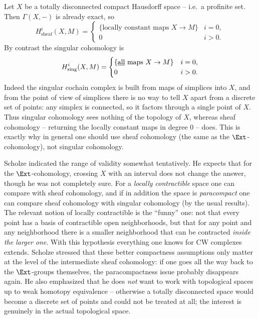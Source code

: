 \begin{example}
\label{ex:4:totally-disconnected}
Let $X$ be a totally disconnected compact Hausdorff space -- i.e.\ a profinite
set. Then $\Gamma(X,-)$ is already exact, so
\begin{equation*}
H^{i}_{\mathrm{sheaf}}(X,M)=
\begin{cases}
\{\text{locally constant maps }X\to M\} & i=0,\\
0 & i>0.
\end{cases}
\end{equation*}
By contrast the singular cohomology is
\begin{equation*}
H^{i}_{\mathrm{sing}}(X,M)=
\begin{cases}
\{\text{\underline{all} maps }X\to M\} & i=0,\\
0 & i>0.
\end{cases}
\end{equation*}
Indeed the singular cochain complex is built from maps of simplices into $X$, and
from the point of view of simplices there is no way to tell $X$ apart from a
discrete set of points: any simplex is connected, so it factors through a single
point of $X$. Thus singular cohomology sees nothing of the topology of $X$,
whereas sheaf cohomology -- returning the locally constant maps in degree $0$
-- does. This is exactly why in general one should use sheaf cohomology (the
same as the $\Ext$-cohomology), not singular cohomology.
\end{example}

\begin{remark}
\label{rmk:4:locally-contractible}
Scholze indicated the range of validity somewhat tentatively. He expects that
for the $\Ext$-cohomology, crossing $X$ with an interval does not change the
answer, though he was not completely sure. For a \emph{locally contractible}
space one can compare with sheaf cohomology, and if in addition the space is
\emph{paracompact} one can compare sheaf cohomology with singular cohomology (by
the usual results). The relevant notion of locally contractible is the ``funny''
one: not that every point has a basis of contractible open neighborhoods, but
that for any point and any neighborhood there is a smaller neighborhood that can
be contracted \emph{inside the larger one}. With this hypothesis everything one
knows for CW complexes extends. Scholze stressed that these better compactness
assumptions only matter at the level of the intermediate sheaf cohomology: if one
goes all the way back to the $\Ext$-groups themselves, the paracompactness issue
probably disappears again. He also emphasized that he does \emph{not} want to
work with topological spaces up to weak homotopy equivalence -- otherwise a
totally disconnected space would become a discrete set of points and could not be
treated at all; the interest is genuinely in the actual topological space.
\end{remark}

